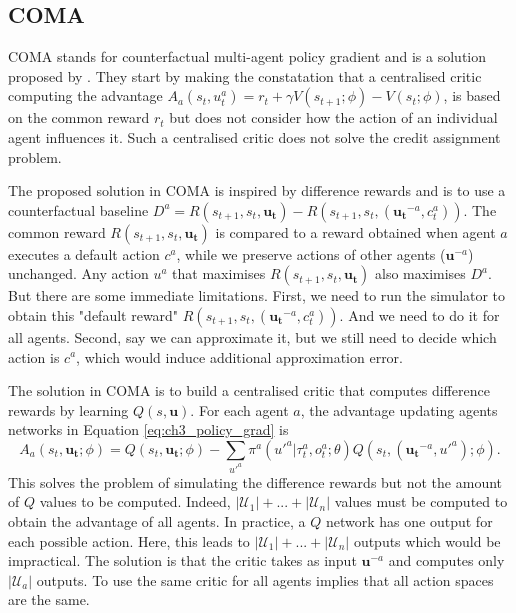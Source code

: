\subsection{COMA}
\label{sec:ch3_coma}

COMA stands for counterfactual multi-agent policy gradient and is a solution proposed by \cite{foerster2017coma}.
They start by making the constatation that a centralised critic computing the advantage $A_a(s_t, u^a_t) = r_t + \gamma V(s_{t+1}; \phi) - V(s_t; \phi)$, is based on the common reward $r_t$ but does not consider how the action of an individual agent influences it.
Such a centralised critic does not solve the credit assignment problem.

The proposed solution in COMA is inspired by difference rewards \citep{wolpert2001optimal} and is to use a counterfactual baseline $D^a=R(s_{t+1}, s_t, \boldsymbol {u_t}) - R(s_{t+1}, s_t, (\boldsymbol{u_t}^{-a}, c_t^a))$.
The common reward $R(s_{t+1}, s_t, \boldsymbol {u_t})$ is compared to a reward obtained when agent $a$ executes a default action $c^a$, while we preserve actions of other agents ($\mathbf{u}^{-a}$) unchanged.
Any action $u^a$ that maximises $R(s_{t+1}, s_t, \boldsymbol {u_t})$ also maximises $D^a$.
But there are some immediate limitations.
First, we need to run the simulator to obtain this "default reward" $R(s_{t+1}, s_t, (\boldsymbol{u_t}^{-a}, c_t^a))$.
And we need to do it for all agents.
Second, say we can approximate it, but we still need to decide which action is $c^a$, which would induce additional approximation error.

The solution in COMA is to build a centralised critic that computes difference rewards by learning $Q(s, \mathbf{u})$.
For each agent $a$, the advantage updating agents networks in Equation \ref{eq:ch3_policy_grad} is 
\begin{equation}
\label{eq:ch3_coma_adv}
A_a(s_t,\boldsymbol{u_t}; \phi)=Q(s_t, \boldsymbol{u_t};\phi) - \sum_{u'^{a}} \pi^a({u'^{a}} |\tau_t^a, o_t^a;\theta) Q(s_t, (\boldsymbol{u_t}^{-a}, u'^{a}); \phi).
\end{equation}
This solves the problem of simulating the difference rewards but not the amount of $Q$ values to be computed.
Indeed, $|\mathcal{U}_1|+...+|\mathcal{U}_n|$ values must be computed to obtain the advantage of all agents.
In practice, a $Q$ network has one output for each possible action.
Here, this leads to $|\mathcal{U}_1|+...+|\mathcal{U}_n|$ outputs which would be impractical.
The solution is that the critic takes as input $\boldsymbol{u}^{-a}$ and computes only $|\mathcal{U}_a|$ outputs.
To use the same critic for all agents implies that all action spaces are the same.

